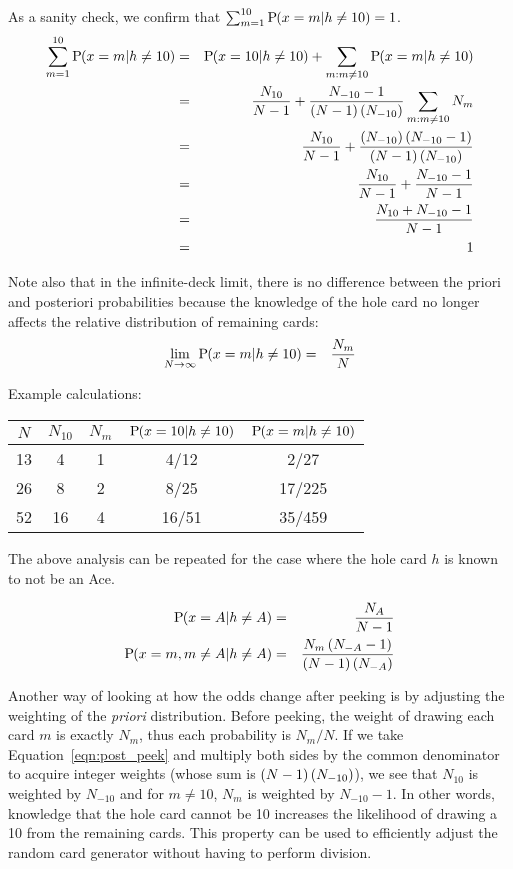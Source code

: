 As a sanity check, we confirm that $\sum_{m=1}^{10}{\textrm{P}\hspace{-.5ex}\left(x=m|h\neq{}10\right)}=1$.
\begin{eqnarray}
\sum_{m=1}^{10}{\textrm{P}\hspace{-.5ex}\left(x=m|h\neq{}10\right)} &=&
\textrm{P}\hspace{-.5ex}\left(x=10|h\neq{}10\right) +\sum_{m:m\neq{}10}^{}{\textrm{P}\hspace{-.5ex}\left(x=m|h\neq{}10\right)}\\
&=& \frac{N_{10}}{N-1}
  +\frac{N_{-10}-1}{\left(N-1\right)\left(N_{-10}\right)} \sum_{m:m\neq{}10}^{}{N_m} \label{eqn:post_peek} \\
&=& \frac{N_{10}}{N-1} +\frac{\left(N_{-10}\right)\left(N_{-10}-1\right)}{\left(N-1\right)\left(N_{-10}\right)}\\
&=& \frac{N_{10}}{N-1} +\frac{N_{-10}-1}{N-1}\\
&=& \frac{N_{10}+N_{-10}-1}{N-1}\\
&=& 1
\end{eqnarray}

Note also that in the infinite-deck limit, there is no difference
between the priori and posteriori probabilities because
the knowledge of the hole card no longer affects the relative distribution of 
remaining cards:
\begin{eqnarray}
\lim_{N\rightarrow\infty}{\textrm{P}\hspace{-.5ex}\left(x=m|h\neq{}10\right)} &=& \frac{N_m}{N}
\end{eqnarray}

\noindent
Example calculations:
\begin{center}
\begin{tabular}{|c|c|c||c|c|}
\hline
$N$ & $N_10$ & $N_m$ & $\textrm{P}\hspace{-.5ex}\left(x=10|h\neq{}10\right)$ & $\textrm{P}\hspace{-.5ex}\left(x=m|h\neq{}10\right)$ \\ \hline \hline
13 & 4 & 1 & 4/12 & 2/27 \\ \hline
26 & 8 & 2 & 8/25 & 17/225 \\ \hline
52 & 16 & 4 & 16/51 & 35/459 \\ \hline
\end{tabular}
\end{center}

The above analysis can be repeated for the case where the hole card $h$
is known to not be an Ace.  

\begin{eqnarray}
\textrm{P}\hspace{-.5ex}\left(x=A|h\neq{}A\right) &=& \frac{N_{A}}{N-1}\\
\textrm{P}\hspace{-.5ex}\left(x=m,m\neq{}A|h\neq{}A\right) &=&
  \frac{N_m\left(N_{-A}-1\right)}{\left(N-1\right)\left(N_{-A}\right)}
\end{eqnarray}

Another way of looking at how the odds change after peeking is
by adjusting the weighting of the \emph{priori} distribution.
Before peeking, the weight of drawing each card $m$ is exactly
$N_m$, thus each probability is $N_m/N$.
If we take Equation~\ref{eqn:post_peek} and multiply both sides
by the common denominator to acquire integer weights (whose sum is 
$\left(N-1\right)\left(N_{-10}\right)$),
we see that $N_{10}$ is weighted by $N_{-10}$ and for $m\neq{}10$, 
$N_m$ is weighted by $N_{-10}-1$.
In other words, knowledge that the hole card cannot be 10 increases
the likelihood of drawing a 10 from the remaining cards.
This property can be used to efficiently adjust the
random card generator without having to perform division.

